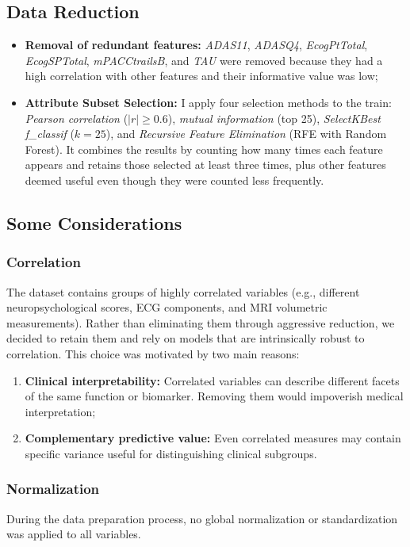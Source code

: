 \subsection{Data Reduction}
\begin{itemize}
	\item \textbf{Removal of redundant features:} \textit{ADAS11}, \textit{ADASQ4}, \textit{EcogPtTotal}, \textit{EcogSPTotal}, \textit{mPACCtrailsB}, and \textit{TAU} were removed because they had a high correlation with other features and their informative value was low;
	\item \textbf{Attribute Subset Selection:} I apply four selection methods to the train: \textit{Pearson correlation} ($|r| \ge 0.6$), \textit{mutual information} (top 25), \textit{SelectKBest f\_classif} ($k=25$), and \textit{Recursive Feature Elimination} (RFE with Random Forest). It combines the results by counting how many times each feature appears and retains those selected at least three times, plus other features deemed useful even though they were counted less frequently.
\end{itemize}

\subsection{Some Considerations}
\subsubsection{Correlation}
The dataset contains groups of highly correlated variables (e.g., different neuropsychological scores, ECG components, and MRI volumetric measurements). Rather than eliminating them through aggressive reduction, we decided to retain them and rely on models that are intrinsically robust to correlation.
This choice was motivated by two main reasons:
\begin{enumerate}
	\item \textbf{Clinical interpretability:} Correlated variables can describe different facets of the same function or biomarker. Removing them would impoverish medical interpretation;
	\item \textbf{Complementary predictive value:} Even correlated measures may contain specific variance useful for distinguishing clinical subgroups.
\end{enumerate}

\subsubsection{Normalization}
During the data preparation process, no global normalization or standardization was applied to all variables. 

